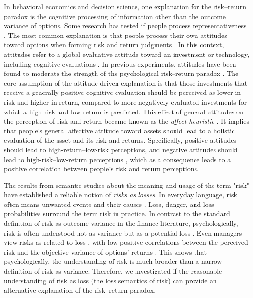 \documentclass[a4paper,man, natbib,floatsintext]{apa6} %
\begin{document}
In behavioral economics and decision science, one explanation for the risk--return paradox is the cognitive processing of information other than the outcome variance of options. Some research has tested if people process representativeness \citep{Shefrin1995, Shefrin2001, Pachur2012b}. The most common explanation is that people process their own attitudes toward options when forming risk and return judgments \citep[e.g.,][]{Finucane2000}. In this context, attitudes refer to a global evaluative attitude toward an investment or technology, including cognitive evaluations \citep[a global "good and bad"; ][]{Ganzach2000, Sjoerberg2007,Sokolowska2015}. In previous experiments, attitudes have been found to moderate the strength of the psychological risk--return paradox \citep{Ganzach2000, Kempf2014, Finucane2000, Slovic2004}. The core assumption of the attitude-driven explanation is that those investments that receive a generally positive cognitive evaluation should be perceived as lower in risk and higher in return, compared to more negatively evaluated investments for which a high risk and low return is predicted. This effect of general attitudes on the perception of risk and return became known as the \textit{affect heuristic} \citep{Finucane2000,Slovic2004}. It implies that people's general affective attitude toward assets should lead to a holistic evaluation of the asset and its risk and returns. Specifically, positive attitudes should lead to high-return--low-risk perceptions, and negative attitudes should lead to high-risk--low-return perceptions \citep{Ganzach2000, Finucane2000}, which as a consequence leads to a positive correlation between people's risk and return perceptions.

 The results from semantic studies about the meaning and usage of the term "risk" have established a reliable notion of \textit{risks as losses}. In everyday language, risk often means unwanted events and their causes \citep[American English corpus from 1992 to 2012,][]{Boholm2016}. Loss, danger, and loss probabilities surround the term risk in practice. In contrast to the standard definition of risk as outcome variance in the finance literature, psychologically, risk is often understood not as variance but as a potential loss \citep[e.g.,][]{Libby1977, Sachse2012}. Even managers view risks as related to loss \citep{Mohr2010, Duxbury2004, Shapira1995}, with low positive correlations between the perceived risk and the objective variance of options' returns \citep{Weber2005,Klos2005a}. This shows that psychologically, the understanding of risk is much broader than a narrow definition of risk as variance. Therefore, we investigated if the reasonable understanding of risk as loss (the loss semantics of risk) can provide an alternative explanation of the risk--return paradox.
\end{document}
